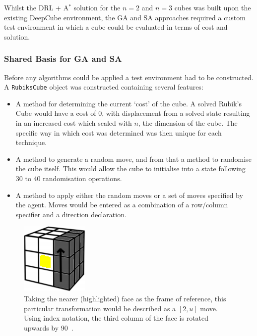 \documentclass[UKenglish]{svproc}
\begin{document}
Whilst the DRL + A$^{\ast}$ solution for the $n=2$ and $n=3$ cubes was built upon the existing DeepCube environment, the GA and SA approaches required a custom test environment in which a cube could be evaluated in terms of cost and solution.

\subsubsection{Shared Basis for GA and SA}
Before any algorithms could be applied a test environment had to be constructed. A \verb|RubiksCube| object was constructed containing several features:
\begin{itemize}
    \item A method for determining the current `cost' of the cube. A solved Rubik's Cube would have a cost of 0, with displacement from a solved state resulting in an increased cost which scaled with $n$, the dimension of the cube. The specific way in which cost was determined was then unique for each technique.
    \item A method to generate a random move, and from that a method to randomise the cube itself. This would allow the cube to initialise into a state following 30 to 40 randomisation operations.
    \item A method to apply either the random moves or a set of moves specified by the agent. Moves would be entered as a combination of a row/column specifier and a direction declaration.
\end{itemize}

\begin{figure}[!ht]
  \centering
  \begin{minipage}[c]{0.2\linewidth}
    \raggedleft
    \includegraphics[width=0.7\linewidth]{move-3u}
  \end{minipage}
  \hfill
  \begin{minipage}[c]{0.75\linewidth}
    \caption{Taking the nearer (highlighted) face as the frame of reference,
      this particular transformation would be described as a $[2,u]$ move. Using
      index notation, the third column of the face is rotated upwards by
      90\textdegree~\cite{proj_l.hoang}.}
    \label{fig:move-3u}
  \end{minipage}
\end{figure}
\end{document}
